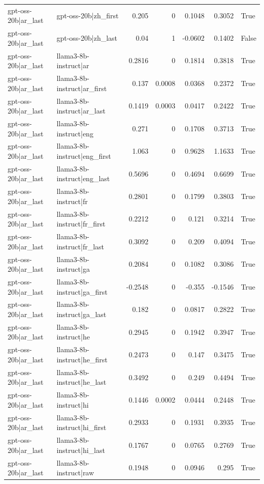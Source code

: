 \begin{table}
\begin{tabular}{l l r r r r l}
gpt-oss-20b|ar_last & gpt-oss-20b|zh_first & 0.205 & 0 & 0.1048 & 0.3052 & True \\
gpt-oss-20b|ar_last & gpt-oss-20b|zh_last & 0.04 & 1 & -0.0602 & 0.1402 & False \\
gpt-oss-20b|ar_last & llama3-8b-instruct|ar & 0.2816 & 0 & 0.1814 & 0.3818 & True \\
gpt-oss-20b|ar_last & llama3-8b-instruct|ar_first & 0.137 & 0.0008 & 0.0368 & 0.2372 & True \\
gpt-oss-20b|ar_last & llama3-8b-instruct|ar_last & 0.1419 & 0.0003 & 0.0417 & 0.2422 & True \\
gpt-oss-20b|ar_last & llama3-8b-instruct|eng & 0.271 & 0 & 0.1708 & 0.3713 & True \\
gpt-oss-20b|ar_last & llama3-8b-instruct|eng_first & 1.063 & 0 & 0.9628 & 1.1633 & True \\
gpt-oss-20b|ar_last & llama3-8b-instruct|eng_last & 0.5696 & 0 & 0.4694 & 0.6699 & True \\
gpt-oss-20b|ar_last & llama3-8b-instruct|fr & 0.2801 & 0 & 0.1799 & 0.3803 & True \\
gpt-oss-20b|ar_last & llama3-8b-instruct|fr_first & 0.2212 & 0 & 0.121 & 0.3214 & True \\
gpt-oss-20b|ar_last & llama3-8b-instruct|fr_last & 0.3092 & 0 & 0.209 & 0.4094 & True \\
gpt-oss-20b|ar_last & llama3-8b-instruct|ga & 0.2084 & 0 & 0.1082 & 0.3086 & True \\
gpt-oss-20b|ar_last & llama3-8b-instruct|ga_first & -0.2548 & 0 & -0.355 & -0.1546 & True \\
gpt-oss-20b|ar_last & llama3-8b-instruct|ga_last & 0.182 & 0 & 0.0817 & 0.2822 & True \\
gpt-oss-20b|ar_last & llama3-8b-instruct|he & 0.2945 & 0 & 0.1942 & 0.3947 & True \\
gpt-oss-20b|ar_last & llama3-8b-instruct|he_first & 0.2473 & 0 & 0.147 & 0.3475 & True \\
gpt-oss-20b|ar_last & llama3-8b-instruct|he_last & 0.3492 & 0 & 0.249 & 0.4494 & True \\
gpt-oss-20b|ar_last & llama3-8b-instruct|hi & 0.1446 & 0.0002 & 0.0444 & 0.2448 & True \\
gpt-oss-20b|ar_last & llama3-8b-instruct|hi_first & 0.2933 & 0 & 0.1931 & 0.3935 & True \\
gpt-oss-20b|ar_last & llama3-8b-instruct|hi_last & 0.1767 & 0 & 0.0765 & 0.2769 & True \\
gpt-oss-20b|ar_last & llama3-8b-instruct|raw & 0.1948 & 0 & 0.0946 & 0.295 & True \\

\end{tabular}
\end{table}
